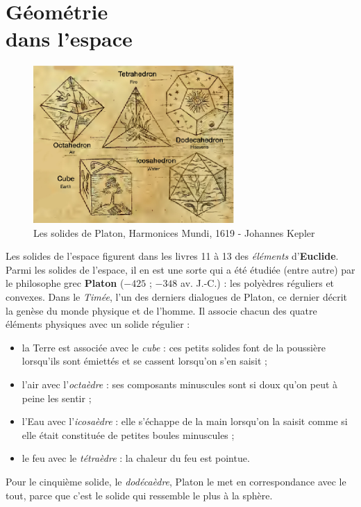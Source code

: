 \chapter{Géométrie\\dans l'espace} \label{G12}

\bigskip

\begin{figure}[h]
   \centering
      \includegraphics[height=6cm]{Geometrie/Images/G12_intro_Platon}
   \caption{Les solides de Platon, Harmonices Mundi, 1619 - Johannes Kepler}
\end{figure}

\bigskip

\begin{prerequis}
   Les solides de l'espace figurent dans les livres 11 à 13 des {\it éléments} d'{\bf Euclide}. \\
   Parmi les solides de l'espace, il en est une sorte qui a été étudiée (entre autre) par le philosophe grec \textbf{Platon} ($-425$ ; $-348$ av. J.-C.) : les polyèdres réguliers et convexes. Dans le \textit{Timée}, l'un des derniers dialogues de Platon, ce dernier décrit la genèse du monde physique et de l'homme. Il associe chacun des quatre éléments physiques avec un solide régulier :      
  \begin{itemize}
      \item la Terre est associée avec le \textit{cube} : ces petits solides font de la poussière lorsqu'ils sont émiettés et se cassent lorsqu'on s'en saisit ;
      \item l'air avec l'\textit{octaèdre} : ses composants minuscules sont si doux qu'on peut à peine les sentir ;
      \item l'Eau avec l'\textit{icosaèdre} : elle s'échappe de la main lorsqu'on la saisit comme si elle était constituée de petites boules minuscules ;
      \item le feu avec le \textit{tétraèdre} : la chaleur du feu est pointue.    
   \end{itemize}
   Pour le cinquième solide, le \textit{dodécaèdre}, Platon le met en correspondance avec le tout, parce que c'est le solide qui ressemble le plus à la sphère.
\end{prerequis}

